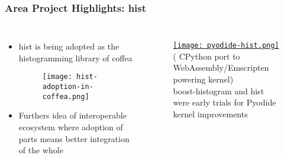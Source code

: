 \begin{frame}
  \frametitle{Area Project Highlights: hist}

  \begin{columns}
    \begin{itemize}\setlength{\itemsep}{0.1 cm}
      \item hist is being adopted as the histogramming library of coffea
      \begin{figure}
        \begin{center}
          \texttt{[image: hist-adoption-in-coffea.png]}
        \end{center}
      \end{figure}
      \item Furthers idea of interoperable ecosystem where adoption of parts means better integration of the whole
    \end{itemize}
%
    \begin{figure}
        \begin{center}
            \href{https://github.com/jpivarski-talks/2022-07-11-scipy-loopy-tutorial}{\texttt{[image: pyodide-hist.png]}}
            {\tiny ( CPython port to WebAssembly/Emscripten powering  kernel)}\\boost-histogram and hist were early trials for Pyodide kernel improvements
        \end{center}
    \end{figure}
  \end{columns}

\end{frame}

